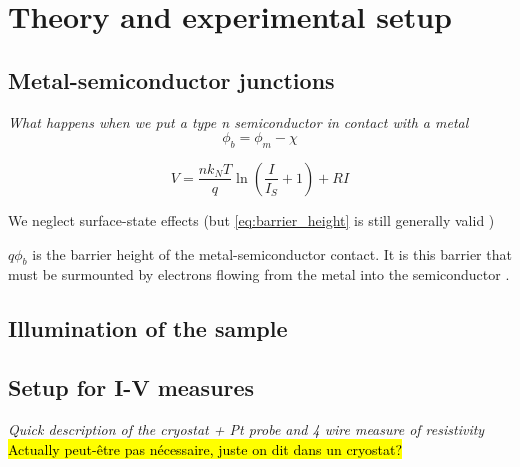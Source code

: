 \section{Theory and experimental setup}
\subsection{Metal-semiconductor junctions}
\emph{What happens when we put a type n semiconductor in contact with a metal}
\begin{equation} \label{eq:barrier_height}
    \phi_b = \phi_m - \chi
\end{equation}

\begin{equation} \label{eq:IV-curve}
    V = \frac{n k_N T}{q} \ln \left( \frac{I}{I_S} +1 \right) + RI
\end{equation}

We neglect surface-state effects (but \autoref{eq:barrier_height} is still generally valid \cite{sze_physics_2007}) 

$q \phi_b$ is the barrier height of the metal-semiconductor contact.
It is this barrier that must be surmounted by electrons flowing from the metal into the semiconductor \cite{sze_physics_2007}.

\subsection{Illumination of the sample}


\subsection{Setup for I-V measures}
\emph{Quick description of the cryostat + Pt probe and 4 wire measure of resistivity}
\hl{Actually peut-être pas nécessaire, juste on dit dans un cryostat?}
